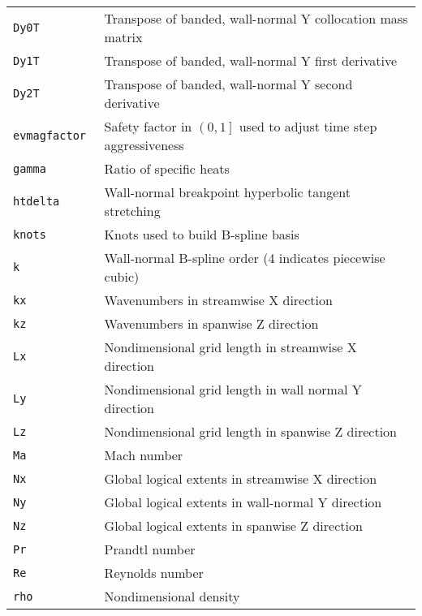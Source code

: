 \begin{table}
\begin{small}
\begin{tabular}{p{}|p{}}
\texttt{Dy0T                  } & Transpose of banded, wall-normal Y collocation mass matrix \\
\texttt{Dy1T                  } & Transpose of banded, wall-normal Y first derivative \\
\texttt{Dy2T                  } & Transpose of banded, wall-normal Y second derivative \\
\texttt{evmagfactor           } & Safety factor in $\left(0,1\right]$ used to adjust time step aggressiveness \\
\texttt{gamma                 } & Ratio of specific heats \\
\texttt{htdelta               } & Wall-normal breakpoint hyperbolic tangent stretching \\
\texttt{knots                 } & Knots used to build B-spline basis \\
\texttt{k                     } & Wall-normal B-spline order (4 indicates piecewise cubic) \\
\texttt{kx                    } & Wavenumbers in streamwise X direction \\
\texttt{kz                    } & Wavenumbers in spanwise Z direction \\
\texttt{Lx                    } & Nondimensional grid length in streamwise X direction \\
\texttt{Ly                    } & Nondimensional grid length in wall normal Y direction \\
\texttt{Lz                    } & Nondimensional grid length in spanwise Z direction \\
\texttt{Ma                    } & Mach number \\
\texttt{Nx                    } & Global logical extents in streamwise X direction \\
\texttt{Ny                    } & Global logical extents in wall-normal Y direction \\
\texttt{Nz                    } & Global logical extents in spanwise Z direction \\
\texttt{Pr                    } & Prandtl number \\
\texttt{Re                    } & Reynolds number \\
\texttt{rho                   } & Nondimensional density \\

\end{tabular}
\end{small}
\end{table}
